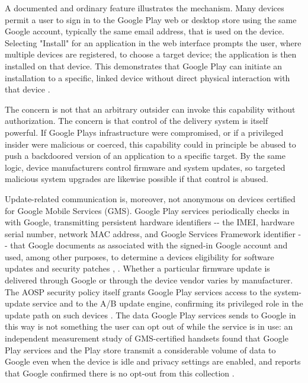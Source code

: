 \documentclass[
]{article}
\begin{document}
A documented and ordinary feature illustrates the mechanism. Many
devices permit a user to sign in to the Google Play web or desktop store
using the same Google account, typically the same email address, that is
used on the device. Selecting "Install" for an application in the web
interface prompts the user, where multiple devices are registered, to
choose a target device; the application is then installed on that
device. This demonstrates that Google Play can initiate an installation
to a specific, linked device without direct physical interaction with
that device \citep{google-play-help}.

The concern is not that an arbitrary outsider can invoke this capability
without authorization. The concern is that control of the delivery
system is itself powerful. If Google Play\textquotesingle s
infrastructure were compromised, or if a privileged insider were
malicious or coerced, this capability could in principle be abused to
push a backdoored version of an application to a specific target. By the
same logic, device manufacturers control firmware and system updates, so
targeted malicious system upgrades are likewise possible if that control
is abused.

Update-related communication is, moreover, not anonymous on devices
certified for Google Mobile Services (GMS). Google Play services
periodically checks in with Google, transmitting persistent hardware
identifiers -\/- the IMEI, hardware serial number, network MAC address,
and Google Services Framework identifier -\/- that Google documents as
associated with the signed-in Google account and used, among other
purposes, to determine a device\textquotesingle s eligibility for
software updates and security patches \citep{leith-handset-privacy},
\citep{google-device-config-service}. Whether a particular firmware
update is delivered through Google or through the device vendor varies
by manufacturer. The AOSP security policy itself grants Google Play
services access to the system-update service and to the A/B update
engine, confirming its privileged role in the update path on such
devices \citep{aosp-sepolicy-gmscore}. The data Google Play services
sends to Google in this way is not something the user can opt out of
while the service is in use: an independent measurement study of
GMS-certified handsets found that Google Play services and the Play
store transmit a considerable volume of data to Google even when the
device is idle and privacy settings are enabled, and reports that Google
confirmed there is no opt-out from this collection
\citep{liu-android-oem-snooping}.
\end{document}
